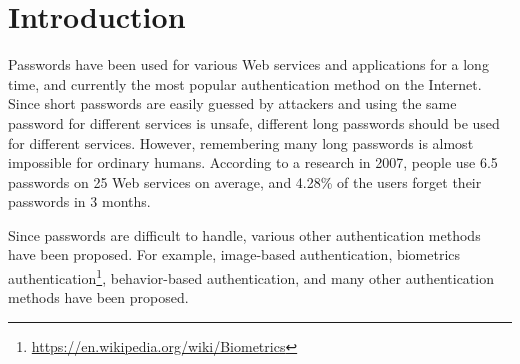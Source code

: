 \documentclass[runningheads,a4paper]{llncs}
\begin{document}
\section{Introduction}
% 

Passwords have been used for various Web services and applications
for a long time, and currently the most popular authentication method on the Internet.
%
Since short passwords are easily guessed by attackers and
using the same password for different services is unsafe,
different long passwords should be used for different services.
However,
remembering many long passwords is almost impossible for ordinary humans.
%
According to a research in 2007,
people use 6.5 passwords on 25 Web services on average, and
4.28\% of the users forget their passwords in 3 months\cite{Florencio:2007:LSW:1242572.1242661}.



%   

Since passwords are difficult to handle,
various other authentication methods have been proposed.
For example,
image-based authentication\cite{Biddle:2012:GPL:2333112.2333114}\cite{GraphicalPasswords}, 
biometrics authentication\footnote{
  \url{https://en.wikipedia.org/wiki/Biometrics}
},
behavior-based authentication\cite{Dandapat:2015:AYD:2702123.2702457}, 
and many other authentication methods have been proposed.

\end{document}
